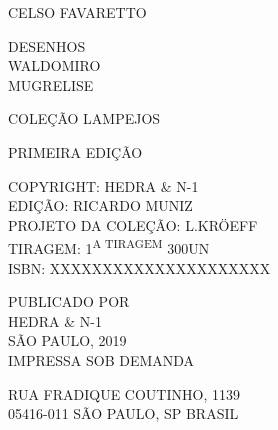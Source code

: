 {{{\vspace{1cm}

CELSO FAVARETTO

\vspace{2cm}

DESENHOS\\
\vspace{0.5cm}
WALDOMIRO\\
\hspace{1.7cm}MUGRELISE\\

\vspace{1cm}

COLEÇÃO LAMPEJOS

\vspace{0.5cm}

PRIMEIRA EDIÇÃO

\vspace{0.5cm}

COPYRIGHT: HEDRA \& N-1\\
EDIÇÃO: RICARDO MUNIZ\\
PROJETO DA COLEÇÃO: L.KRÖEFF\\
TIRAGEM: 1\textsuperscript{A TIRAGEM} 300UN\\
ISBN: XXXXXXXXXXXXXXXXXXXXX\\

\vspace{1cm}

PUBLICADO POR\\
HEDRA \& N-1\\
SÃO PAULO, 2019\\
IMPRESSA SOB DEMANDA\\

\vspace{0.5cm}

RUA FRADIQUE COUTINHO, 1139\\
05416-011 SÃO PAULO, SP BRASIL

}}


{\Formular{\Huge{\titulagem}}}
\vspace{11.25mm}

{\LARGE{\autor} \par}%
\vspace{6cm} %
\vspace{8.5mm}

}
